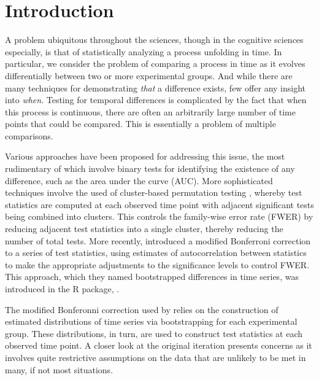 \section{Introduction}

A problem ubiquitous throughout the sciences, though in the cognitive sciences especially, is that of statistically analyzing a process unfolding in time. In particular, we consider the problem of comparing a process in time as it evolves differentially between two or more experimental groups. And while there are many techniques for demonstrating \textit{that} a difference exists, few offer any insight into \textit{when}. Testing for temporal differences is complicated by the fact that when this process is continuous, there are often an arbitrarily large number of time points that could be compared. This is essentially a problem of multiple comparisons.

Various approaches have been proposed for addressing this issue, the most rudimentary of which involve binary tests for identifying the existence of any difference, such as the area under the curve (AUC).  More sophisticated techniques involve the used of cluster-based permutation testing \citep{Maris2007}, whereby test statistics are computed at each observed time point with adjacent significant tests being combined into clusters. This controls the family-wise error rate (FWER) by reducing adjacent test statistics into a single cluster, thereby reducing the number of total tests. More recently, \citet{oleson2017detecting} introduced a modified Bonferroni correction to a series of test statistics, using estimates of autocorrelation between statistics to make the appropriate adjustments to the significance levels to control FWER. This approach, which they named bootstrapped differences in time series, was introduced in the R package,  \citep{seedorff2018bdots}.

The modified Bonferonni correction used by  relies on the construction of estimated distributions of time series via bootstrapping for each experimental group. These distributions, in turn, are used to construct test statistics at each observed time point. A closer look at the original iteration presents concerns as it involves quite restrictive assumptions on the data that are unlikely to be met in many, if not most situations. 

